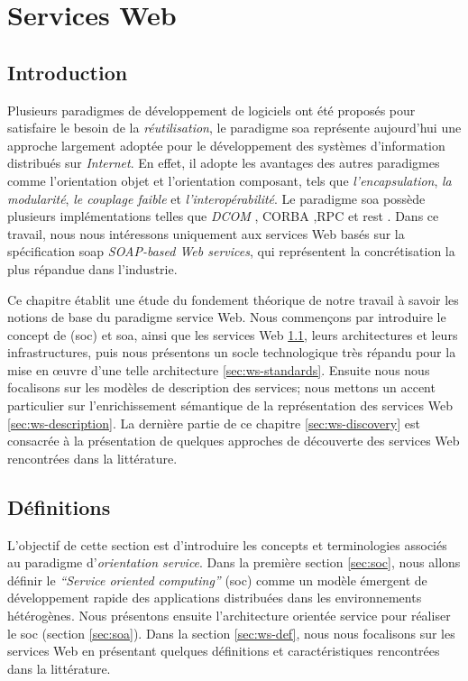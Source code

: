 \chapter{Services Web}
\label{ch:web-service}

\section*{Introduction}
 

Plusieurs paradigmes de développement de logiciels ont été proposés
pour satisfaire le besoin de la \textit{réutilisation}, le paradigme
\acrshort{soa} représente aujourd'hui une approche largement adoptée
pour le développement des systèmes d'information distribués sur
\textit{Internet}. En effet, il adopte les avantages des autres
paradigmes comme l'orientation objet et l'orientation composant, tels
que \textit{l'encapsulation}, \textit{la modularité}, \textit{le
  couplage faible} et \textit{l'interopérabilité}. Le paradigme
\acrshort{soa} possède plusieurs implémentations telles que
\textit{DCOM} \cite{frank1997dcom}, \textsc{CORBA}
\cite{vinoski1997corba},\textsc{RPC} \cite{bloomer1992power} et
\acrshort{rest} \cite{fielding2000architectural}. Dans ce travail,
nous nous intéressons uniquement aux services Web basés sur la
spécification \acrshort{soap} \textit{SOAP-based Web services}, qui
représentent la concrétisation la plus répandue dans
l'industrie.\bigskip

Ce chapitre établit une étude du fondement théorique de notre travail
à savoir les notions de base du paradigme service Web. Nous commençons
par introduire le concept de (\acrshort{soc}) et \acrshort{soa}, ainsi
que les services Web \ref{sec:ws-definitions}, leurs architectures et
leurs infrastructures, puis nous présentons un socle technologique
très répandu pour la mise en œuvre d'une telle architecture
\ref{sec:ws-standards}. Ensuite nous nous focalisons sur les modèles de
description des services; nous mettons un accent particulier sur
l'enrichissement sémantique de la représentation des services Web
\ref{sec:ws-description}. La dernière partie de ce chapitre \ref{sec:ws-discovery} 
est consacrée à la présentation de quelques approches de
découverte des services Web rencontrées dans la littérature.

\newpage
\section{Définitions}
\label{sec:ws-definitions}
L'objectif de cette section est d'introduire les concepts et
terminologies associés au paradigme d'\textit{orientation
  service}. Dans la première section \ref{sec:soc}, nous allons
définir le \textit{``Service oriented computing''} (\acrshort{soc})
comme un modèle émergent de développement rapide des applications
distribuées dans les environnements hétérogènes. Nous présentons
ensuite l'architecture orientée service pour réaliser le
\acrshort{soc} (section \ref{sec:soa}). Dans la section
\ref{sec:ws-def}, nous nous focalisons sur les services Web en
présentant quelques définitions et caractéristiques rencontrées dans
la littérature.

